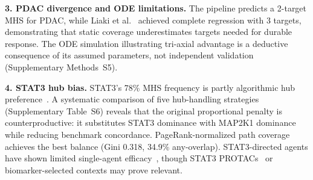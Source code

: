 \documentclass[times, twoside, watermark]{zHenriquesLab-StyleBioRxiv}
\begin{document}
\textbf{3. PDAC divergence and ODE limitations.} The pipeline predicts a 2-target MHS for PDAC, while Liaki et al.~\cite{Liaki2025} achieved complete regression with 3 targets, demonstrating that static coverage underestimates targets needed for durable response. The ODE simulation illustrating tri-axial advantage is a deductive consequence of its assumed parameters, not independent validation (Supplementary Methods~S5).

\textbf{4. STAT3 hub bias.} STAT3's 78\% MHS frequency is partly algorithmic hub preference~\cite{VeraLicona2013}. A systematic comparison of five hub-handling strategies (Supplementary Table~S6) reveals that the original proportional penalty is counterproductive: it substitutes STAT3 dominance with MAP2K1 dominance while reducing benchmark concordance. PageRank-normalized path coverage achieves the best balance (Gini 0.318, 34.9\% any-overlap). STAT3-directed agents have shown limited single-agent efficacy~\cite{Johnson2018,Jonker2018}, though STAT3 PROTACs~\cite{Bai2019} or biomarker-selected contexts may prove relevant.
\end{document}
